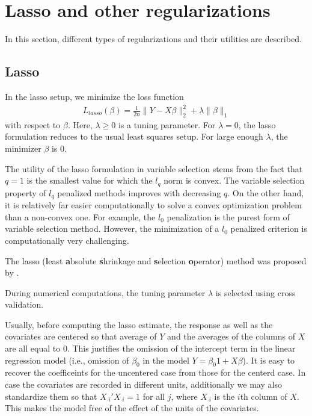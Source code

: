 \documentclass[
]{book}
\begin{document}
\hypertarget{regularizations-description}{%
\section{Lasso and other regularizations}\label{regularizations-description}}

In this section, different types of regularizations and their utilities are described.

\hypertarget{lasso-description}{%
\subsection{Lasso}\label{lasso-description}}

In the lasso setup, we minimize the loss function
\begin{align*}
L_{lasso}(\beta) = \frac{1}{2n} \| Y - X \beta \|^2_2 + \lambda \| \beta \|_1
\end{align*}
with respect to \(\beta\). Here, \(\lambda \ge 0\) is a tuning parameter. For \(\lambda = 0\), the lasso formulation reduces to the usual least squares setup. For large enough \(\lambda\), the minimizer \(\beta\) is \(0\).

The utility of the lasso formulation in variable selection stems from the fact that \(q = 1\) is the smallest value for which the \(l_q\) norm is convex. The variable selection property of \(l_q\) penalized methods improves with decreasing \(q\). On the other hand, it is relatively far easier computationally to solve a convex optimization problem than a non-convex one. For example, the \(l_0\) penalization is the purest form of variable selection method. However, the minimization of a \(l_0\) penalized criterion is computationally very challenging.

The lasso (\textbf{l}east \textbf{a}bsolute \textbf{s}hrinkage and \textbf{s}election \textbf{o}perator) method was proposed by \citet{tibshirani1996regression}.

During numerical computations, the tuning parameter \(\lambda\) is selected using cross validation.

Usually, before computing the lasso estimate, the response as well as the covariates are centered so that average of \(Y\) and the averages of the columns of \(X\) are all equal to \(0\). This justifies the omission of the intercept term in the linear regression model (i.e., omission of \(\beta_0\) in the model \(Y = \beta_0 1 + X \beta\)). It is easy to recover the coefficeints for the uncentered case from those for the centerd case. In case the covariates are recorded in different units, additionally we may also standardize them so that \(X_{\cdot i}' X_{\cdot i} = 1\) for all \(j\), where \(X_{\cdot i}\) is the \(i\)th column of \(X\). This makes the model free of the effect of the units of the covariates.
\end{document}
